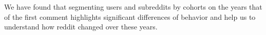 

We have found that segmenting users and subreddits by cohorts on the years that of the first comment highlights significant differences of behavior and help us to understand how reddit changed over these years.



